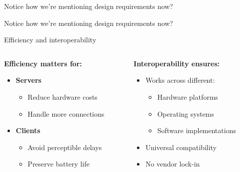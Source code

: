 \documentclass[aspectratio=169, lualatex, handout]{beamer}
\begin{document}
\begin{frame}{Notice how we're mentioning design requirements now?}
\end{frame}

\begin{frame}{Notice how we're mentioning design requirements now?}
	\begin{center}
	\end{center}
\end{frame}

\begin{frame}{Efficiency and interoperability}
	\begin{columns}[c]
		\begin{column}{0.5\textwidth}
			\textbf{Efficiency matters for:}
			\begin{itemize}
				\item \textbf{Servers}
				      \begin{itemize}
					      \item Reduce hardware costs
					      \item Handle more connections
				      \end{itemize}
				\item \textbf{Clients}
				      \begin{itemize}
					      \item Avoid perceptible delays
					      \item Preserve battery life
				      \end{itemize}
			\end{itemize}
		\end{column}
		\begin{column}{0.5\textwidth}
			\textbf{Interoperability ensures:}
			\begin{itemize}
				\item Works across different:
				      \begin{itemize}
					      \item Hardware platforms
					      \item Operating systems
					      \item Software implementations
				      \end{itemize}
				\item Universal compatibility
				\item No vendor lock-in
			\end{itemize}
		\end{column}
	\end{columns}
\end{frame}
\end{document}
